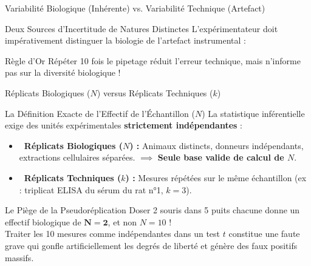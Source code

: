 \documentclass[aspectratio=169,10pt]{beamer}
\begin{document}
\begin{frame}{Variabilité Biologique (Inhérente) vs. Variabilité Technique (Artefact)}
  \begin{conceptbox}{Deux Sources d'Incertitude de Natures Distinctes}
    L'expérimentateur doit impérativement distinguer la biologie de l'artefact instrumental :
  \end{conceptbox}
  \vspace{0.5mm}
  \noindent{}
  \vspace{0.5mm}
  \begin{takeawaybox}{Règle d'Or}
    Répéter 10 fois le pipetage réduit l'erreur technique, mais n'informe pas sur la diversité biologique !
  \end{takeawaybox}
\end{frame}

\begin{frame}{Réplicats Biologiques ($N$) versus Réplicats Techniques ($k$)}
  \begin{conceptbox}{La Définition Exacte de l'Effectif de l'Échantillon ($N$)}
    La statistique inférentielle exige des unités expérimentales \textbf{strictement indépendantes} :
    \begin{itemize}\setlength{\itemsep}{1.5pt}
      \item \textbf{\color{BioTeal}\faCheckCircle\ Réplicats Biologiques ($N$) :} Animaux distincts, donneurs indépendants, extractions cellulaires séparées. $\implies$ \textbf{Seule base valide de calcul de $N$}.
      \item \textbf{\color{BioRed}\faTimesCircle\ Réplicats Techniques ($k$) :} Mesures répétées sur le même échantillon (ex : triplicat ELISA du sérum du rat n°1, $k=3$).
    \end{itemize}
  \end{conceptbox}
  \vspace{1.5mm}
  \begin{warnbox}{Le Piège de la Pseudoréplication}
    Doser 2 souris dans 5 puits chacune donne un effectif biologique de $\mathbf{N = 2}$, et non $N = 10$ !\\
    Traiter les 10 mesures comme indépendantes dans un test $t$ constitue une faute grave qui gonfle artificiellement les degrés de liberté et génère des faux positifs massifs.
  \end{warnbox}
\end{frame}
\end{document}
